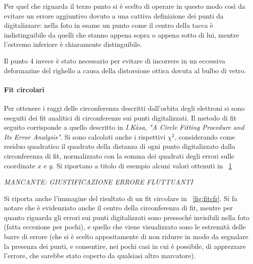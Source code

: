 \documentclass[10pt,a4paper]{article}
\begin{document}
Per quel che riguarda il terzo punto si è scelto di operare in questo modo così da evitare un errore aggiuntivo dovuto a una cattiva definizione dei punti da digitalizzare: nella foto in esame un punto come il centro della tacca è indistinguibile da quelli che stanno appena sopra o appena sotto di lui, mentre l'estremo inferiore è chiaramente distinguibile.

Il punto 4 invece è stato necessario per evitare di incorrere in un eccessiva deformazine del righello a causa della distorsione ottica dovuta al bulbo di vetro.

\paragraph{Fit circolari} Per ottenere i raggi delle circonferenza descritti dall'orbita degli elettroni si sono eseguiti dei fit analitici di circonferenze sui punti digitalizzati. Il metodo di fit seguito corrisponde a quello descritto in \emph{I.Kàsa, "A Circle Fitting Procedure and Its Error Analysis"}.
Si sono calcolati anche i rispettivi $\chi^2$, considerando come residuo quadratico il quadrato della distanza di ogni punto digitalizzato dalla circonferenza di fit, normalizzato con la somma dei quadrati degli errori sulle coordinate $x$ e $y$.
Si riportano a titolo di esempio alcuni valori ottenuti in \tablename{~\ref{tab:rpchi2}}

\begin{figure}[H]
	\centering
	\resizebox{0.3\textwidth}{!}{
		}
	\label{tab:rpchi2}
\end{figure}

\emph{MANCANTE: GIUSTIFICAZIONE ERRORE FLUTTUANTI}

Si riporta anche l'immagine del risultato di un fit circolare in \figurename{~\ref{fig:fitcfr}}. Si fa notare che è evidenziato anche il centro della circonferenza di fit, mentre per quanto riguarda gli errori sui punti digitalizzati sono pressoché invisibili nella foto (fatta eccezione per pochi), e quello che viene visualizzato sono le estremità delle barre di errore (che si è scelto appositamente di non ridurre in modo da segnalare la presenza dei punti, e consentire, nei pochi casi in cui è possibile, di apprezzare l'errore, che sarebbe stato coperto da qualsiasi altro marcatore).
\end{document}
